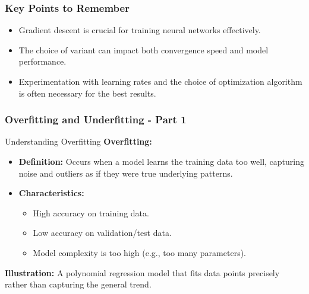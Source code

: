 \documentclass[aspectratio=169]{beamer}
\begin{document}
\begin{frame}[fragile]
    \frametitle{Key Points to Remember}
    \begin{itemize}
        \item Gradient descent is crucial for training neural networks effectively.
        \item The choice of variant can impact both convergence speed and model performance.
        \item Experimentation with learning rates and the choice of optimization algorithm is often necessary for the best results.
    \end{itemize}
\end{frame}

\begin{frame}[fragile]
    \frametitle{Overfitting and Underfitting - Part 1}
    
    \begin{block}{Understanding Overfitting}
        \textbf{Overfitting:}
        \begin{itemize}
            \item \textbf{Definition:} Occurs when a model learns the training data too well, capturing noise and outliers as if they were true underlying patterns.
            \item \textbf{Characteristics:}
            \begin{itemize}
                \item High accuracy on training data.
                \item Low accuracy on validation/test data.
                \item Model complexity is too high (e.g., too many parameters).
            \end{itemize}
        \end{itemize}
        
        \textbf{Illustration:} 
        A polynomial regression model that fits data points precisely rather than capturing the general trend.
    \end{block}
\end{frame}
\end{document}
